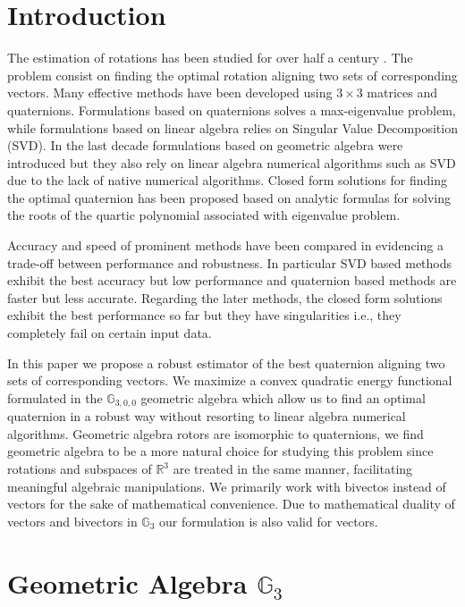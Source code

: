 \documentclass{birkjour}
\numberwithin{equation}{section}
\begin{document}
\section{Introduction}

\indent The estimation of rotations has been studied for over half a century \cite{Wahba1965}. The problem consist on finding the optimal rotation aligning two sets of corresponding vectors. Many effective methods have been developed \cite{Arun1987, Horn1987, Mortari1996, Shuster1981, Yang2015} using $3\times3$ matrices and quaternions. Formulations based on quaternions solves a max-eigenvalue problem, while formulations based on linear algebra relies on Singular Value Decomposition (SVD). In the last decade formulations based on geometric algebra \cite{Perwass2009, Dorst2011} were introduced but they also rely on linear algebra numerical algorithms such as SVD due to the lack of native numerical algorithms. Closed form solutions for finding the optimal quaternion has been proposed \cite{Yang2013, Wu2017, Wu2018FA3R, Wu2018FS3R} based on analytic formulas for solving the roots of the quartic polynomial associated with eigenvalue problem.

Accuracy and speed of prominent methods have been compared in  \cite{Eggert1997, Markley1999, Wu2017} evidencing a trade-off between performance and robustness. In particular SVD based methods exhibit the best accuracy but low performance and quaternion based methods are faster but less accurate. Regarding the later methods, the closed form solutions exhibit the best performance so far but they have singularities i.e., they completely fail on certain input data.

In this paper we propose a robust estimator of the best quaternion aligning two sets of corresponding vectors. We maximize a convex quadratic energy functional formulated in the $\mathbb{G}_{3,0,0}$ geometric algebra which allow us to find an optimal quaternion in a robust way without resorting to linear algebra numerical algorithms. Geometric algebra rotors are isomorphic to quaternions, we find geometric algebra to be a more natural choice for studying this problem since rotations and subspaces of $\mathbb R^3$ are treated in the same manner, facilitating meaningful algebraic manipulations. We primarily work with bivectos instead of vectors for the sake of mathematical convenience. Due to mathematical duality of vectors and bivectors in $\mathbb{G}_3$ our formulation is also valid for vectors.

\section{Geometric Algebra $\mathbb{G}_3$}
\end{document}

